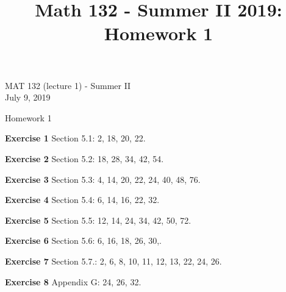 \documentclass[12pt,oneside]{exam}
\title{Math 132 - Summer II 2019: Homework 1}
\newenvironment{exercise}[1]{\vspace{.1in}\noindent\textbf{Exercise #1 \hspace{.05em}}}{}
\begin{document}
\begin{flushright}
\sc MAT 132 (lecture 1) - Summer II\\
July 9, 2019
\end{flushright}
\bigskip

\begin{center}
\textsf{Homework 1} 
\end{center}


\begin{exercise}{1}
Section 5.1: 2, 18, 20, 22. 
\end{exercise}

\begin{exercise}{2}
Section 5.2: 18, 28, 34, 42, 54.
\end{exercise}

\begin{exercise}{3}
Section 5.3: 4, 14, 20, 22, 24, 40, 48, 76. 
\end{exercise}

\begin{exercise}{4}
Section 5.4: 6, 14, 16, 22, 32. 
\end{exercise}

\begin{exercise}{5}
Section 5.5: 12, 14, 24, 34, 42, 50, 72.
\end{exercise}

\begin{exercise}{6}
Section 5.6: 6, 16, 18, 26, 30,.
\end{exercise}

\begin{exercise}{7}
Section 5.7.: 2, 6, 8, 10, 11, 12, 13, 22, 24, 26. 
\end{exercise}

\begin{exercise}{8}
Appendix G: 24, 26, 32. 
\end{exercise}
\end{document}

